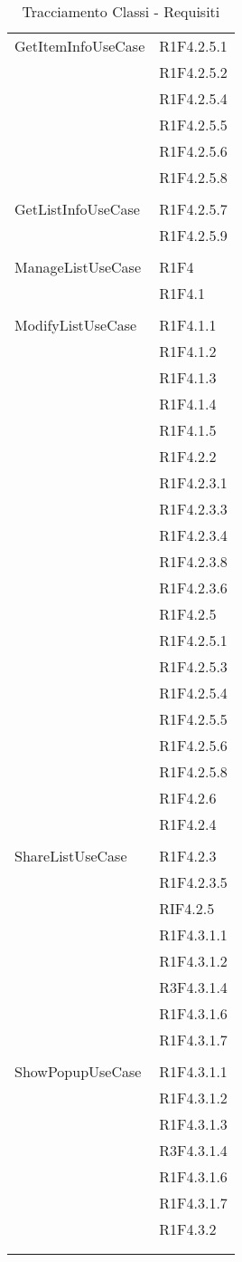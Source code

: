 \begin{center}
\begin{longtable}{|p{7cm}|p{7cm}|}
		GetItemInfoUseCase & R1F4.2.5.1 \\ & R1F4.2.5.2 \\ & R1F4.2.5.4 \\ & R1F4.2.5.5 \\ & R1F4.2.5.6 \\ & R1F4.2.5.8 \\ & \\ \hline
		GetListInfoUseCase & R1F4.2.5.7 \\ & R1F4.2.5.9 \\ & \\ \hline
		ManageListUseCase & R1F4 \\ & R1F4.1 \\ & \\ \hline
		ModifyListUseCase & R1F4.1.1 \\ & R1F4.1.2 \\ & R1F4.1.3 \\ & R1F4.1.4 \\ & R1F4.1.5 \\ & R1F4.2.2 \\ & R1F4.2.3.1 \\ & R1F4.2.3.3 \\ & R1F4.2.3.4 \\ & R1F4.2.3.8 \\ & R1F4.2.3.6 \\ & R1F4.2.5 \\ & R1F4.2.5.1 \\ & R1F4.2.5.3 \\ & R1F4.2.5.4 \\ & R1F4.2.5.5 \\ & R1F4.2.5.6 \\ & R1F4.2.5.8 \\ & R1F4.2.6 \\ & R1F4.2.4 \\ & \\ \hline
		ShareListUseCase & R1F4.2.3 \\ & R1F4.2.3.5 \\ & RIF4.2.5 \\ & R1F4.3.1.1 \\ & R1F4.3.1.2 \\ & R3F4.3.1.4 \\ & R1F4.3.1.6 \\ & R1F4.3.1.7 \\ & \\ \hline
		ShowPopupUseCase & R1F4.3.1.1 \\ & R1F4.3.1.2 \\ & R1F4.3.1.3 \\ & R3F4.3.1.4 \\ & R1F4.3.1.6 \\ & R1F4.3.1.7 \\ & R1F4.3.2 \\ & \\ \hline
	\caption[Tracciamento Classi - Requisiti]{Tracciamento Classi - Requisiti}
	\label{tabella: Tracciamento Classi - Requisiti}
	\end{longtable}
\end{center}
